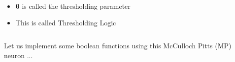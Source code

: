 \documentclass[serif, aspectratio=169]{beamer}
\begin{document}
\begin{frame}
\begin{columns}
\begin{overlayarea}{\textwidth}{\textheight}
\begin{itemize}

\vspace{-0.4in}
\item<15-> $\mathbf{\theta}$ is called the thresholding parameter
\item<16-> This is called Thresholding Logic
\end{itemize}
\end{overlayarea}


\end{columns}
\end{frame}


\begin{frame}
Let us implement some boolean functions using this McCulloch Pitts (MP) neuron ...
\end{frame}
\end{document}
